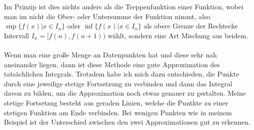\documentclass[a4paper,12pt]{article}
\theoremstyle{definition}
\theoremstyle{remark}
\begin{document}
Im Prinzip ist dies nichts anders als die Treppenfunktion einer Funktion, wobei man im nicht 
die Ober- oder Untersumme der Funktion nimmt, also $\sup{\{f(x) | x \in I_n\}}$ oder 
$\inf{\{f(x) | x\in I_n\}}$ als obere Grenze der Rechtecke Intervall $I_n = [f(n), f(n+1))$ 
wählt, sondern eine Art Mischung aus beidem. 
\\ \\
Wenn man eine große Menge an Datenpunkten hat und diese sehr nah aneinander liegen, dann ist 
diese Methode eine gute Approximation des tatsächlichen Integrals. Trotzdem habe ich mich dazu entschieden, 
die Punkte durch eine jeweilige stetige Fortsetzung zu verbinden und dann das Integral davon zu 
bilden, um die Approximation noch etwas genauer zu gestalten. Meine stetige Fortsetzng besteht aus 
geraden Linien, welche die Puntkte zu einer stetigen Funktion am Ende verbinden. Bei wenigen Punkten 
wie in meinem Beispiel ist der Unterschied zwischen den zwei Approximationen gut zu erkennen.
\begin{figure}[h!]
\centering
{}
\end{figure}
\end{document}
